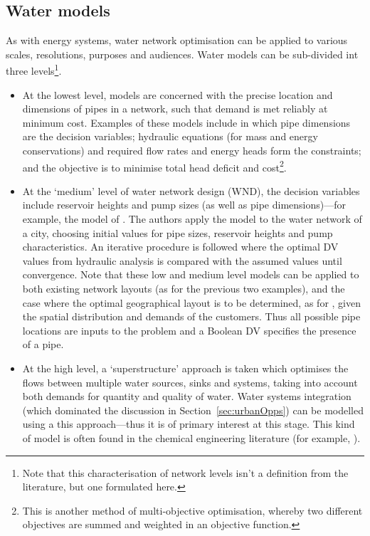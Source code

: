 \subsection{Water models}
As with energy systems, water network optimisation can be applied to various scales, resolutions, purposes and audiences. Water models can be sub-divided int three levels\footnote{Note that this characterisation of network levels isn't a definition from the literature, but one formulated here.}. 
\begin{itemize} 
	\item At the lowest level, models are concerned with the precise location and dimensions of pipes in a network, such that demand is met reliably at minimum cost. Examples of these models include \citet{Keedwell2005} in which pipe dimensions are the decision variables; hydraulic equations (for mass and energy conservations) and required flow rates and energy heads form the constraints; and the objective is to minimise total head deficit and cost\footnote{This is another method of multi-objective optimisation, whereby two different objectives are summed and weighted in an objective function.}. 
	\item At the `medium' level of water network design (WND), the decision variables include reservoir heights and pump sizes (as well as pipe dimensions)---for example, the model of \citet{Zanganeh2010}. The authors apply the model to the water network of a city, choosing initial values for pipe sizes, reservoir heights and pump characteristics. An iterative procedure is followed where the optimal DV values from hydraulic analysis is compared with the assumed values until convergence. Note that these low and medium level models can be applied to both existing network layouts (as for the previous two examples), and the case where the optimal geographical layout is to be determined, as for \citet{Lejano2006}, given the spatial distribution and demands of the customers. Thus all possible pipe locations are inputs to the problem and a Boolean DV specifies the presence of a pipe. 
	\item At the high level, a `superstructure' approach is taken which optimises the flows between multiple water sources, sinks and systems, taking into account both demands for quantity and quality of water. Water systems integration (which dominated the discussion in Section~\ref{sec:urbanOpps}) can be modelled using a this approach---thus it is of primary interest at this stage. This kind of model is often found in the chemical engineering literature (for example, \citet{Khor2012}).
\end{itemize}
